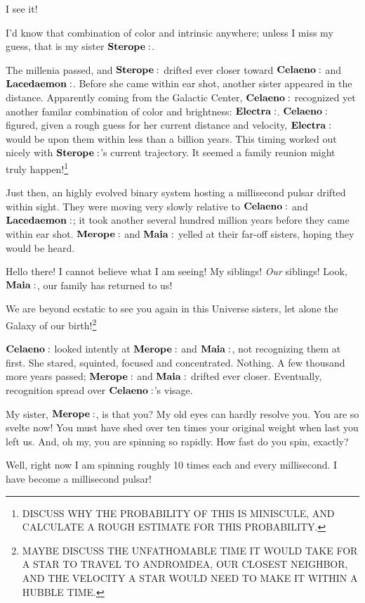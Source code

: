 \documentclass[main.tex]{subfiles}
\begin{document}
\Lacedaemon I see it!

\Celaeno I'd know that combination of color and intrinsic anywhere; unless I miss my guess, that is my sister $\Sterope$.  

The millenia passed, and $\Sterope$ drifted ever closer toward $\Celaeno$ and $\Lacedaemon$.  Before she came within ear shot, another sister appeared in the distance.  Apparently coming from the Galactic Center, $\Celaeno$ recognized yet another familar combination of color and brightness:  $\Electra$.  $\Celaeno$ figured, given a rough guess for her current distance and velocity, $\Electra$ would be upon them within less than a billion years.  This timing worked out nicely with $\Sterope$'s current trajectory.  It seemed a family reunion might truly happen!\footnote{DISCUSS WHY THE PROBABILITY OF THIS IS MINISCULE, AND CALCULATE A ROUGH ESTIMATE FOR THIS PROBABILITY.}

Just then, an highly evolved binary system hosting a millisecond pulsar drifted within sight.  They were moving very slowly relative to $\Celaeno$ and $\Lacedaemon$; it took another several hundred million years before they came within ear shot.  $\Merope$ and $\Maia$ yelled at their far-off sisters, hoping they would be heard.

\Merope Hello there!  I cannot believe what I am seeing!  My siblings!  \textit{Our} siblings!  Look, $\Maia$, our family has returned to us!  

\Maia We are beyond ecstatic to see you again in this Universe sisters, let alone the Galaxy of our birth!\footnote{MAYBE DISCUSS THE UNFATHOMABLE TIME IT WOULD TAKE FOR A STAR TO TRAVEL TO ANDROMDEA, OUR CLOSEST NEIGHBOR, AND THE VELOCITY A STAR WOULD NEED TO MAKE IT WITHIN A HUBBLE TIME.}

$\Celaeno$ looked intently at $\Merope$ and $\Maia$, not recognizing them at first.  She stared, squinted, focused and concentrated.  Nothing.  A few thousand more years passed; $\Merope$ and $\Maia$ drifted ever closer.  Eventually, recognition spread over $\Celaeno$'s visage.

\Celaeno My sister, $\Merope$, is that you?  My old eyes can hardly resolve you.  You are so svelte now!  You must have shed over ten times your original weight when last you left us.  And, oh my, you are spinning so rapidly.  How fast do you spin, exactly?

\Merope Well, right now I am spinning roughly 10 times each and every millisecond.  I have become a millisecond pulsar!  
\end{document}
